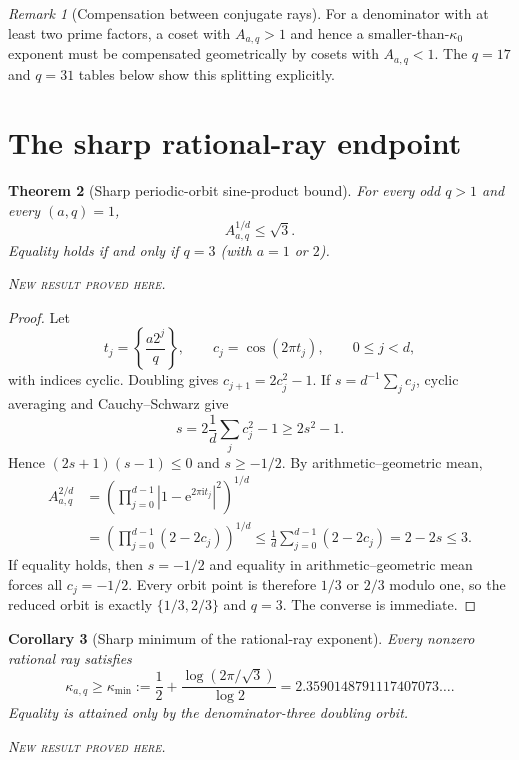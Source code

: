 \documentclass[11pt,oneside]{article}
\newtheorem{theorem}{Theorem}[section]
\newtheorem{corollary}[theorem]{Corollary}
\theoremstyle{definition}
\theoremstyle{remark}
\newtheorem{remark}[theorem]{Remark}
\newcommand{\e}{\mathrm e}
\newcommand{\ii}{\mathrm i}
\newcommand{\newresult}{\textcolor{newgreen}{\textsc{New result proved here.}}}
\begin{document}
\begin{remark}[Compensation between conjugate rays]
For a denominator with at least two prime factors, a coset with $A_{a,q}>1$ and
hence a smaller-than-$\kappa_0$ exponent must be compensated geometrically by
cosets with $A_{a,q}<1$. The $q=17$ and $q=31$ tables below show this splitting
explicitly.
\end{remark}

\section{The sharp rational-ray endpoint}\label{sec:sharp-endpoint}

\begin{theorem}[Sharp periodic-orbit sine-product bound]\label{thm:sqrt3-bound}
For every odd $q>1$ and every $(a,q)=1$,
\begin{equation}
 \boxed{A_{a,q}^{1/d}\le\sqrt3.}
 \label{eq:sqrt3-bound}
\end{equation}
Equality holds if and only if $q=3$ (with $a=1$ or $2$).

\smallskip\noindent\newresult
\end{theorem}

\begin{proof}
Let
\[
 t_j=\left\{\frac{a2^j}{q}\right\},\qquad
 c_j=\cos(2\pi t_j),\qquad0\le j<d,
\]
with indices cyclic. Doubling gives $c_{j+1}=2c_j^2-1$. If
$s=d^{-1}\sum_jc_j$, cyclic averaging and Cauchy--Schwarz give
\[
 s=2\frac1d\sum_jc_j^2-1\ge2s^2-1.
\]
Hence $(2s+1)(s-1)\le0$ and $s\ge-1/2$. By arithmetic--geometric mean,
\begin{align*}
 A_{a,q}^{2/d}
 &=\left(\prod_{j=0}^{d-1}|1-\e^{2\pi\ii t_j}|^2\right)^{1/d}\\
 &=\left(\prod_{j=0}^{d-1}(2-2c_j)\right)^{1/d}
 \le\frac1d\sum_{j=0}^{d-1}(2-2c_j)
 =2-2s\le3.
\end{align*}
If equality holds, then $s=-1/2$ and equality in arithmetic--geometric mean forces
all $c_j=-1/2$. Every orbit point is therefore $1/3$ or $2/3$ modulo one, so the
reduced orbit is exactly $\{1/3,2/3\}$ and $q=3$. The converse is immediate.
\end{proof}

\begin{corollary}[Sharp minimum of the rational-ray exponent]\label{cor:kappa-minimum}
Every nonzero rational ray satisfies
\begin{equation}
 \boxed{
 \kappa_{a,q}\ge\kappa_{\min}:=\frac12+\frac{\log(2\pi/\sqrt3)}{\log2}
 =2.3590148791117407073\ldots.}
 \label{eq:kappa-minimum}
\end{equation}
Equality is attained only by the denominator-three doubling orbit.

\smallskip\noindent\newresult
\end{corollary}
\end{document}
